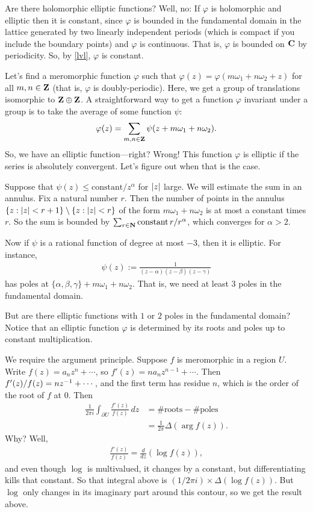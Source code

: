 \documentclass[11pt, oneside,margin=1in]{article}
\begin{document}
Are there holomorphic elliptic functions? Well, no: If $\varphi$ is holomorphic and elliptic then it is constant, since $\varphi$ is bounded in the fundamental domain in the lattice generated by two linearly independent periods (which is compact if you include the boundary points) and $\varphi$ is continuous. That is, $\varphi$ is bounded on $\mathbf C$ by periodicity. So, by \cref{lvl}, $\varphi$ is constant.

Let's find a meromorphic function $\varphi$ such that $\varphi(z) = \varphi (m\omega_1 + n\omega_2 + z)$ for all $m,n\in\mathbf Z$ (that is, $\varphi$ is doubly-periodic). Here, we get a group of translations isomorphic to $\mathbf Z\oplus\mathbf Z$. A straightforward way to get a function $\varphi$ invariant under a group is to take the average of some function $\psi$:  
 \begin{align*}
	\varphi(z) = \sum_{m,n\in \mathbf Z} \psi (z+m\omega_1 + n\omega_2).
\end{align*}
So, we have an elliptic function---right? Wrong! This function $\varphi$ is elliptic if the series is absolutely convergent. Let's figure out when that is the case.

Suppose that $\psi(z)\le \textrm{constant}/z^\alpha$ for $\left \lvert z \right \rvert$ large. We will estimate the sum in an annulus. Fix a natural number $r$. Then the number of points in the annulus $\{z : \left \lvert z \right \rvert < r+1\} \setminus \{z : \left \lvert z \right \rvert < r\}$ of the form $m\omega_1 + n\omega_2$ is at most a constant times $r$. So the sum is bounded by $\sum _{r\in \mathbf N} \textrm{constant}\, r/r^\alpha$, which converges for $\alpha>2$.

Now if $\psi$ is a rational function of degree at most $-3$, then it is elliptic. For instance,
\begin{align*}
	\psi(z) := \frac{1}{ (z-\alpha) (z-\beta) (z-\gamma)}
\end{align*}
has poles at $\{\alpha,\beta,\gamma\}+m\omega_1 + n\omega_2$. That is, we need at least $3$ poles in the fundamental domain. 

But are there elliptic functions with $1$ or $2$ poles in the fundamental domain? Notice that an elliptic function $\varphi$ is determined by its roots and poles up to constant multiplication. 

We require the argument principle. Suppose $f$ is meromorphic in a region $U$. Write $f(z) = a_nz^n+\cdots$, so $f'(z) = na_nz^{n-1} + \cdots$. Then $f'(z)/f (z) = nz^{-1} + \cdots$, and the first term has residue $n$, which is the order of the root of $f$ at $0$. Then 
\begin{align*}
\frac{1}{2\pi i} \int_{\partial U} \frac{f'(z)}{f (z)} \, dz &= \# \textrm{roots} - \#\textrm{poles} \\
							     &= \frac{1}{2\pi}\Delta (\arg f(z)).
\end{align*}
Why? Well, 
\begin{align*}
	\frac{f'(z)}{f (z)} = \frac{d}{dz} (\log  f(z)),
\end{align*}
and even though $\log$ is multivalued, it changes by a constant, but differentiating kills that constant. So that integral above is $(1/2\pi i)\times \Delta  (\log f(z))$. But $\log$ only changes in its imaginary part around this contour, so we get the result above.
\end{document}
